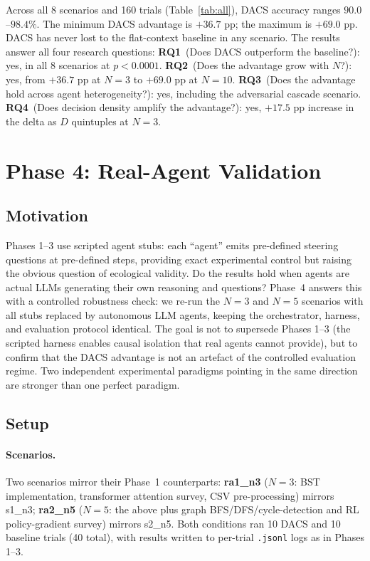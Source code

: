 \documentclass{article}
\begin{document}
Across all 8 scenarios and 160 trials (Table~\ref{tab:all}), DACS
accuracy ranges $90.0$--$98.4\%$.
The minimum DACS advantage is $+36.7$ pp; the maximum is $+69.0$ pp.
DACS has never lost to the flat-context baseline in any scenario.
The results answer all four research questions:
\textbf{RQ1}~(Does DACS outperform the baseline?): yes, in all 8
scenarios at $p<0.0001$.
\textbf{RQ2}~(Does the advantage grow with $N$?): yes, from
$+36.7$ pp at $N=3$ to $+69.0$ pp at $N=10$.
\textbf{RQ3}~(Does the advantage hold across agent heterogeneity?):
yes, including the adversarial cascade scenario.
\textbf{RQ4}~(Does decision density amplify the advantage?): yes,
$+17.5$ pp increase in the delta as $D$ quintuples at $N=3$.

\section{Phase 4: Real-Agent Validation}
\label{sec:phase4}

\subsection{Motivation}
\label{sec:motivation}

Phases 1--3 use scripted agent stubs: each ``agent'' emits pre-defined
steering questions at pre-defined steps, providing exact experimental
control but raising the obvious question of ecological validity.
Do the results hold when agents are actual LLMs generating their own
reasoning and questions?
Phase~4 answers this with a controlled robustness check: we re-run the
$N{=}3$ and $N{=}5$ scenarios with all stubs replaced by autonomous LLM
agents, keeping the orchestrator, harness, and evaluation protocol
identical.
The goal is not to supersede Phases 1--3 (the scripted harness enables
causal isolation that real agents cannot provide), but to confirm that
the DACS advantage is not an artefact of the controlled evaluation regime.
Two independent experimental paradigms pointing in the same direction are
stronger than one perfect paradigm.

\subsection{Setup}
\label{sec:setup_p4}

\paragraph{Scenarios.}
Two scenarios mirror their Phase~1 counterparts:
\textbf{ra1\_n3} ($N{=}3$: BST implementation, transformer attention survey,
CSV pre-processing) mirrors s1\_n3;
\textbf{ra2\_n5} ($N{=}5$: the above plus graph BFS/DFS/cycle-detection and
RL policy-gradient survey) mirrors s2\_n5.
Both conditions ran 10 DACS and 10 baseline trials (40 total),
with results written to per-trial \texttt{.jsonl} logs as in Phases 1--3.
\end{document}
